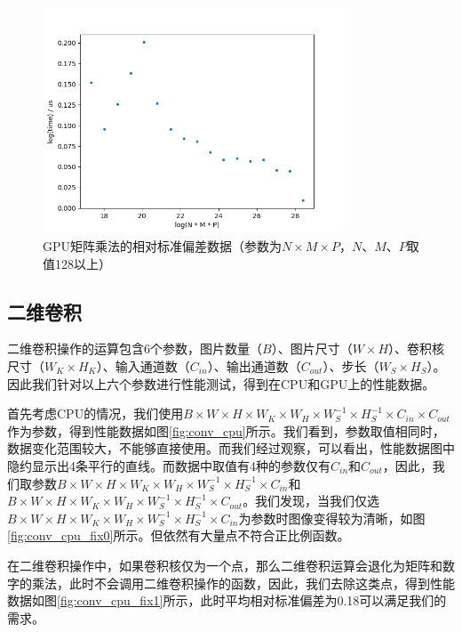     \begin{figure}[!htbp]
        \centering
        \includegraphics[width=0.8\textwidth]{figures/matmul_gpu_nmp_rsd_big.png}
        \caption{GPU矩阵乘法的相对标准偏差数据（参数为$ N \times M \times P $，$ N $、$ M $、$ P $取值128以上）}
        \label{fig:matmul_gpu_nmp_rsd_big}
    \end{figure}

\subsection{二维卷积}
\label{ssec:impl_conv}
    二维卷积操作的运算包含6个参数，图片数量（$ B $）、图片尺寸（$ W \times H $）、卷积核尺寸（$ W_K \times H_K $）、输入通道数（$ C_{in} $）、输出通道数（$ C_{out} $）、步长（$ W_S \times H_S $）。因此我们针对以上六个参数进行性能测试，得到在CPU和GPU上的性能数据。

    首先考虑CPU的情况，我们使用$ B \times W \times H \times W_K \times W_H \times W_S^{-1} \times H_S^{-1} \times C_{in} \times C_{out} $作为参数，得到性能数据如图\ref{fig:conv_cpu}所示。我们看到，参数取值相同时，数据变化范围较大，不能够直接使用。而我们经过观察，可以看出，性能数据图中隐约显示出4条平行的直线。而数据中取值有4种的参数仅有$ C_{in} $和$ C_{out} $，因此，我们取参数$ B \times W \times H \times W_K \times W_H \times W_S^{-1} \times H_S^{-1} \times C_{in} $和$ B \times W \times H \times W_K \times W_H \times W_S^{-1} \times H_S^{-1} \times C_{out} $。我们发现，当我们仅选$ B \times W \times H \times W_K \times W_H \times W_S^{-1} \times H_S^{-1} \times C_{in}  $为参数时图像变得较为清晰，如图\ref{fig:conv_cpu_fix0}所示。但依然有大量点不符合正比例函数。
    
    在二维卷积操作中，如果卷积核仅为一个点，那么二维卷积运算会退化为矩阵和数字的乘法，此时不会调用二维卷积操作的函数，因此，我们去除这类点，得到性能数据如图\ref{fig:conv_cpu_fix1}所示，此时平均相对标准偏差为0.18可以满足我们的需求。

